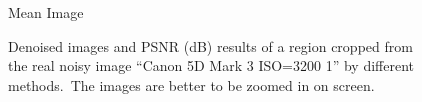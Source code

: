 \begin{figure}
{\begin{minipage}[t]{0.19\textwidth}
{\footnotesize Mean Image }
\end{minipage}
}
    \caption{Denoised images and PSNR (dB) results of a region cropped from the real noisy image ``Canon 5D Mark 3 ISO=3200 1'' \cite{crosschannel2016} by different methods.\ The images are better to be zoomed in on screen.}
    \label{fig4-13}
\end{figure}



\begin{figure}
    \centering
{}
\end{figure}
